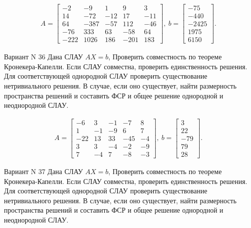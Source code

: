\documentclass[11pt]{report}
\begin{document}
\begin{align*}
 A = \left[\begin{matrix}-2 & -9 & 1 & 9 & 3\\14 & -72 & -12 & 17 & -11\\64 & -387 & -57 & 112 & -46\\-76 & 333 & 63 & -58 & 64\\-222 & 1026 & 186 & -201 & 183\end{matrix}\right],
\ b = \left[\begin{matrix}-75\\-440\\-2425\\1975\\6150\end{matrix}\right]. 
 \end{align*}

Вариант N 36
Дана СЛАУ $AX = b$,
Проверить совместность по теореме Кронекера-Капелли. Если СЛАУ совместна, проверить единственность решения.
Для соответствующей однородной СЛАУ проверить существование нетривиального решения. В случае, если оно существует,
найти размерность пространства решений и составить ФСР и общее решение однородной  и неоднородной СЛАУ.


\begin{align*}
 A = \left[\begin{matrix}-6 & 3 & -1 & -7 & 8\\1 & -1 & -9 & 6 & 7\\-22 & 13 & 33 & -45 & -4\\3 & 3 & -4 & -2 & -9\\7 & -4 & 7 & -8 & -3\end{matrix}\right],
\ b = \left[\begin{matrix}3\\22\\-79\\79\\28\end{matrix}\right]. 
 \end{align*}

Вариант N 37
Дана СЛАУ $AX = b$,
Проверить совместность по теореме Кронекера-Капелли. Если СЛАУ совместна, проверить единственность решения.
Для соответствующей однородной СЛАУ проверить существование нетривиального решения. В случае, если оно существует,
найти размерность пространства решений и составить ФСР и общее решение однородной  и неоднородной СЛАУ.
\end{document}
